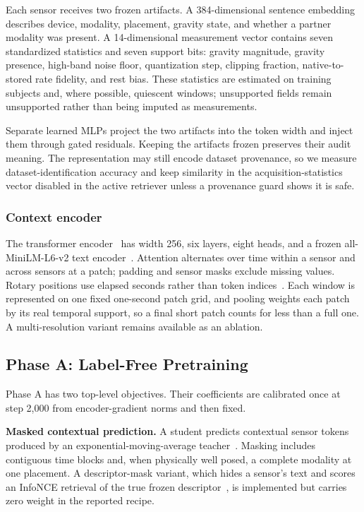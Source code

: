 Each sensor receives two frozen artifacts. A 384-dimensional sentence embedding describes device,
modality, placement, gravity state, and whether a partner modality was present. A 14-dimensional
measurement vector contains seven standardized statistics and seven support bits: gravity
magnitude, gravity presence, high-band noise floor, quantization step, clipping fraction, native-to-
stored rate fidelity, and rest bias. These statistics are estimated on training subjects and, where
possible, quiescent windows; unsupported fields remain unsupported rather than being imputed as
measurements.

Separate learned MLPs project the two artifacts into the token width and inject them through gated
residuals. Keeping the artifacts frozen preserves their audit meaning. The representation may still
encode dataset provenance, so we measure dataset-identification accuracy and keep similarity in the
acquisition-statistics vector disabled in the active retriever unless a provenance guard shows it is
safe.

\subsubsection{Context encoder}
\label{sec:encoder}

The transformer encoder~\cite{transformer} has width 256, six layers, eight heads, and a frozen
all-MiniLM-L6-v2 text encoder~\cite{sbert}. Attention alternates over time within a sensor and across sensors at a patch;
padding and sensor masks exclude missing values. Rotary positions use elapsed seconds rather than
token indices~\cite{rope}. Each window is represented on one fixed one-second patch grid, and
pooling weights each patch by its real temporal support, so a final short patch counts for less than
a full one. A multi-resolution variant remains available as an ablation.

\subsection{Phase A: Label-Free Pretraining}
\label{sec:phaseA_design}

Phase A has two top-level objectives. Their coefficients are calibrated once at step 2,000 from
encoder-gradient norms and then fixed.

\textbf{Masked contextual prediction.} A student predicts contextual sensor tokens produced by an
exponential-moving-average teacher~\cite{byol,data2vec,ijepa}. Masking includes contiguous time
blocks and, when physically well posed, a complete modality at one placement. A descriptor-mask
variant, which hides a sensor's text and scores an InfoNCE retrieval of the true frozen
descriptor~\cite{infonce}, is implemented but carries zero weight in the reported recipe.

